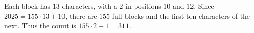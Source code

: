 Each block has $13$ characters, with a $2$ in positions $10$ and $12$. Since $2025=155\cdot13+10$, there are $155$ full blocks and the first ten characters of the next. Thus the count is $155\cdot2+1=\boxed{311}$.
